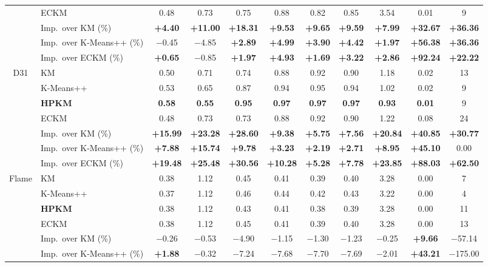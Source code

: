 \begin{table}[p]
\begin{adjustbox}{max width=\textwidth, max totalheight=0.86\textheight}
\begin{tabular}{|c|l|ccccccccc|}
 & ECKM & 0.48 & 0.73 & 0.75 & 0.88 & 0.82 & 0.85 & 3.54 & 0.01 & 9 \\
& Imp.\ over KM (\%) & \textbf{+4.40} & \textbf{+11.00} & \textbf{+18.31} & \textbf{+9.53} & \textbf{+9.65} & \textbf{+9.59} & \textbf{+7.99} & \textbf{+32.67} & \textbf{+36.36} \\
& Imp.\ over K-Means++ (\%) & $-$0.45 & $-$4.85 & \textbf{+2.89} & \textbf{+4.99} & \textbf{+3.90} & \textbf{+4.42} & \textbf{+1.97} & \textbf{+56.38} & \textbf{+36.36} \\
& Imp.\ over ECKM (\%) & \textbf{+0.65} & $-$0.85 & \textbf{+1.97} & \textbf{+4.93} & \textbf{+1.69} & \textbf{+3.22} & \textbf{+2.86} & \textbf{+92.24} & \textbf{+22.22} \\
\hline
D31 & KM & 0.50 & 0.71 & 0.74 & 0.88 & 0.92 & 0.90 & 1.18 & 0.02 & 13 \\
 & K-Means++ & 0.53 & 0.65 & 0.87 & 0.94 & 0.95 & 0.94 & 1.02 & 0.02 & 9 \\
 & \textbf{HPKM} & \textbf{0.58} & \textbf{0.55} & \textbf{0.95} & \textbf{0.97} & \textbf{0.97} & \textbf{0.97} & \textbf{0.93} & \textbf{0.01} & 9 \\
 & ECKM & 0.48 & 0.73 & 0.73 & 0.88 & 0.92 & 0.90 & 1.22 & 0.08 & 24 \\
& Imp.\ over KM (\%) & \textbf{+15.99} & \textbf{+23.28} & \textbf{+28.60} & \textbf{+9.38} & \textbf{+5.75} & \textbf{+7.56} & \textbf{+20.84} & \textbf{+40.85} & \textbf{+30.77} \\
& Imp.\ over K-Means++ (\%) & \textbf{+7.88} & \textbf{+15.74} & \textbf{+9.78} & \textbf{+3.23} & \textbf{+2.19} & \textbf{+2.71} & \textbf{+8.95} & \textbf{+45.10} & 0.00 \\
& Imp.\ over ECKM (\%) & \textbf{+19.48} & \textbf{+25.48} & \textbf{+30.56} & \textbf{+10.28} & \textbf{+5.28} & \textbf{+7.78} & \textbf{+23.85} & \textbf{+88.03} & \textbf{+62.50} \\
\hline
Flame & KM & 0.38 & 1.12 & 0.45 & 0.41 & 0.39 & 0.40 & 3.28 & 0.00 & 7 \\
 & K-Means++ & 0.37 & 1.12 & 0.46 & 0.44 & 0.42 & 0.43 & 3.22 & 0.00 & 4 \\
 & \textbf{HPKM} & 0.38 & 1.12 & 0.43 & 0.41 & 0.38 & 0.39 & 3.28 & 0.00 & 11 \\
 & ECKM & 0.38 & 1.12 & 0.45 & 0.41 & 0.39 & 0.40 & 3.28 & 0.00 & 13 \\
& Imp.\ over KM (\%) & $-$0.26 & $-$0.53 & $-$4.90 & $-$1.15 & $-$1.30 & $-$1.23 & $-$0.25 & \textbf{+9.66} & $-$57.14 \\
& Imp.\ over K-Means++ (\%) & \textbf{+1.88} & $-$0.32 & $-$7.24 & $-$7.68 & $-$7.70 & $-$7.69 & $-$2.01 & \textbf{+43.21} & $-$175.00 \\

\end{tabular}
\end{adjustbox}
\end{table}
